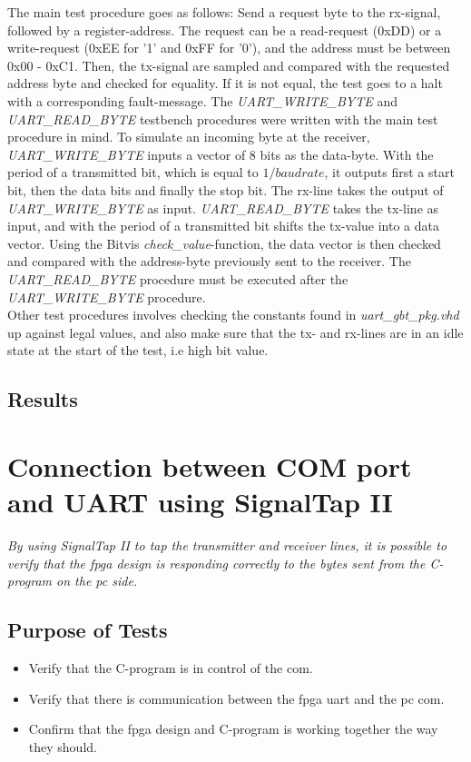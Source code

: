 \documentclass[main.tex]{subfiles}
\begin{document}
The main test procedure goes as follows: Send a request byte to the rx-signal, followed by a register-address. The request can be a read-request (0xDD) or a write-request (0xEE for '1' and 0xFF for '0'), and the address must be between 0x00 - 0xC1. Then, the tx-signal are sampled and compared with the requested address byte and checked for equality. If it is not equal, the test goes to a halt with a corresponding fault-message. The \textit{UART\_WRITE\_BYTE} and \textit{UART\_READ\_BYTE} testbench procedures were written with the main test procedure in mind. To simulate an incoming byte at the receiver, \textit{UART\_WRITE\_BYTE} inputs a vector of 8 bits as the data-byte. With the period of a transmitted bit, which is equal to $1/baud rate$, it outputs first a start bit, then the data bits and finally the stop bit. The rx-line takes the output of \textit{UART\_WRITE\_BYTE} as input. \textit{UART\_READ\_BYTE} takes the tx-line as input, and with the period of a transmitted bit shifts the tx-value into a data vector. Using the Bitvis \textit{check\_value}-function, the data vector is then checked and compared with the address-byte previously sent to the receiver. The \textit{UART\_READ\_BYTE} procedure must be executed after the \textit{UART\_WRITE\_BYTE} procedure. \\

Other test procedures involves checking the constants found in \textit{uart\_gbt\_pkg.vhd} up against legal values, and also make sure that the tx- and rx-lines are in an idle state at the start of the test, i.e high bit value.

\subsection{Results}

\section{Connection between COM port and UART using SignalTap II}

\textit{By using SignalTap II to tap the transmitter and receiver lines, it is possible to verify that the \gls{fpga} design is responding correctly to the bytes sent from the C-program on the \gls{pc} side.} 

\subsection{Purpose of Tests}
\begin{itemize}\setlength{\itemsep}{10pt}
\item Verify that the C-program is in control of the \gls{com}.
\item Verify that there is communication between the \gls{fpga} \gls{uart} and the \gls{pc} \gls{com}.
\item Confirm that the \gls{fpga} design and C-program is working together the way they should.
\end{itemize}
\end{document}
